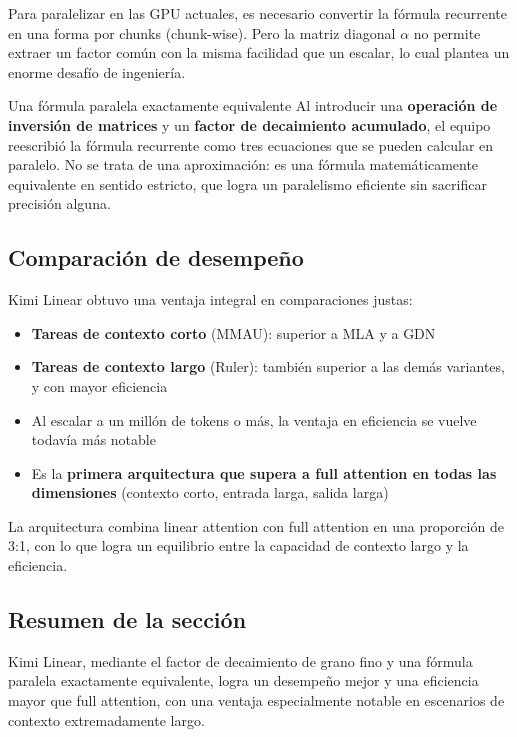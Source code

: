 \documentclass[a4paper]{article}
\begin{document}
Para paralelizar en las GPU actuales, es necesario convertir la fórmula recurrente en una forma por chunks (chunk-wise). Pero la matriz diagonal $\alpha$ no permite extraer un factor común con la misma facilidad que un escalar, lo cual plantea un enorme desafío de ingeniería.

\begin{importantbox}{Una fórmula paralela exactamente equivalente}
Al introducir una \textbf{operación de inversión de matrices} y un \textbf{factor de decaimiento acumulado}, el equipo reescribió la fórmula recurrente como tres ecuaciones que se pueden calcular en paralelo. No se trata de una aproximación: es una fórmula matemáticamente equivalente en sentido estricto, que logra un paralelismo eficiente sin sacrificar precisión alguna.
\end{importantbox}

\subsection{Comparación de desempeño}

Kimi Linear obtuvo una ventaja integral en comparaciones justas:
\begin{itemize}
    \item \textbf{Tareas de contexto corto} (MMAU): superior a MLA y a GDN
    \item \textbf{Tareas de contexto largo} (Ruler): también superior a las demás variantes, y con mayor eficiencia
    \item Al escalar a un millón de tokens o más, la ventaja en eficiencia se vuelve todavía más notable
    \item Es la \textbf{primera arquitectura que supera a full attention en todas las dimensiones} (contexto corto, entrada larga, salida larga)
\end{itemize}

La arquitectura combina linear attention con full attention en una proporción de 3:1, con lo que logra un equilibrio entre la capacidad de contexto largo y la eficiencia.

\subsection{Resumen de la sección}

Kimi Linear, mediante el factor de decaimiento de grano fino y una fórmula paralela exactamente equivalente, logra un desempeño mejor y una eficiencia mayor que full attention, con una ventaja especialmente notable en escenarios de contexto extremadamente largo.
\end{document}

